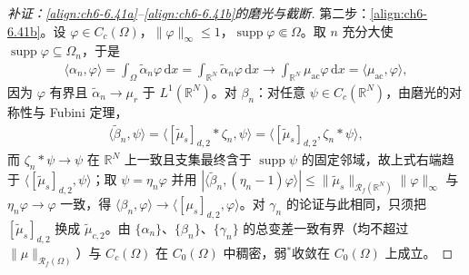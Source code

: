 \documentclass[../../main.tex]{subfiles}%
\begin{document}
\begin{proof}[补证：\eqref{align:ch6-6.41a}--\eqref{align:ch6-6.41b}的磨光与截断]
第二步：\eqref{align:ch6-6.41b}。设 $\varphi\in C_c(\Omega)$，$\|\varphi\|_\infty\leqslant1$，$\operatorname{supp}\varphi\Subset\Omega$。取 $n$ 充分大使 $\operatorname{supp}\varphi\subseteq\Omega_n$，于是
\begin{align*}
\langle\alpha_n,\varphi\rangle=\int_\Omega\widetilde\alpha_n\varphi\,\mathrm{d}x
=\int_{\mathbb{R}^N}\widetilde\alpha_n\varphi\,\mathrm{d}x\to\int_{\mathbb{R}^N}\mu_{\mathrm{ac}}\varphi\,\mathrm{d}x
=\langle\mu_{\mathrm{ac}},\varphi\rangle,
\end{align*}
因为 $\varphi$ 有界且 $\widetilde\alpha_n\to\mu_r$ 于 $L^1(\mathbb{R}^N)$。对 $\beta_n$：对任意 $\psi\in C_c(\mathbb{R}^N)$，由磨光的对称性与 Fubini 定理，
\begin{align*}
\langle\widetilde\beta_n,\psi\rangle=\langle[\widetilde\mu_s]_{d,2}*\zeta_n,\psi\rangle
=\langle[\widetilde\mu_s]_{d,2},\zeta_n*\psi\rangle,
\end{align*}
而 $\zeta_n*\psi\to\psi$ 在 $\mathbb{R}^N$ 上一致且支集最终含于 $\operatorname{supp}\psi$ 的固定邻域，故上式右端趋于 $\langle[\widetilde\mu_s]_{d,2},\psi\rangle$；取 $\psi=\eta_n\varphi$ 并用 $|\langle\widetilde\beta_n,(\eta_n-1)\varphi\rangle|\leqslant\|\widetilde\mu_s\|_{\mathscr{R}_f(\mathbb{R}^N)}\|\varphi\|_\infty$ 与 $\eta_n\varphi\to\varphi$ 一致，得 $\langle\beta_n,\varphi\rangle\to\langle[\mu_s]_{d,2},\varphi\rangle$。对 $\gamma_n$ 的论证与此相同，只须把 $[\widetilde\mu_s]_{d,2}$ 换成 $\widetilde\mu_{c,2}$。由 $\{\alpha_n\}$、$\{\beta_n\}$、$\{\gamma_n\}$ 的总变差一致有界（均不超过 $\|\mu\|_{\mathscr{R}_f(\Omega)}$）与 $C_c(\Omega)$ 在 $C_0(\Omega)$ 中稠密，弱$^*$收敛在 $C_0(\Omega)$ 上成立。
\end{proof}
\end{document}
